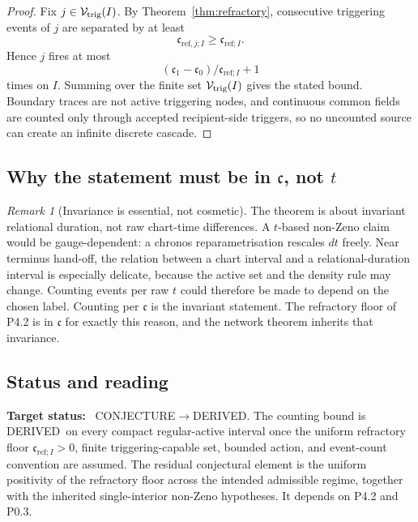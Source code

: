 \documentclass[11pt,a4paper]{article}
\newcommand{\stDerived}{\textcolor{cDer}{\textsf{\small DERIVED}}}
\newcommand{\stConj}{\textcolor{cCon}{\textsf{\small CONJECTURE}}}
\theoremstyle{definition}
\theoremstyle{plain}
\theoremstyle{remark}
\newtheorem{remark}[definition]{Remark}
\begin{document}
\begin{proof}
Fix \(j\in\mathcal V_{\rm trig}(I)\). By
Theorem~\ref{thm:refractory}, consecutive triggering events of \(j\) are separated
by at least
\[
\mathfrak c_{\mathrm{ref},j;I}\ge\mathfrak c_{\mathrm{ref};I}.
\]
Hence \(j\) fires at most
\[
(\mathfrak c_1-\mathfrak c_0)/\mathfrak c_{\mathrm{ref};I}+1
\]
times on \(I\). Summing over the finite set
\(\mathcal V_{\rm trig}(I)\) gives the stated bound. Boundary traces are not active
triggering nodes, and continuous common fields are counted only through accepted
recipient-side triggers, so no uncounted source can create an infinite discrete
cascade. \qedhere
\end{proof}

\subsection{Why the statement must be in \texorpdfstring{\(\mathfrak c\)}{c}, not \texorpdfstring{\(t\)}{t}}

\begin{remark}[Invariance is essential, not cosmetic]\label{rem:invariance}
The theorem is about invariant relational duration, not raw chart-time
differences. A \(t\)-based non-Zeno claim would be gauge-dependent: a chronos
reparametrisation rescales \(dt\) freely. Near terminus hand-off, the relation
between a chart interval and a relational-duration interval is especially delicate,
because the active set and the density rule may change. Counting events per raw
\(t\) could therefore be made to depend on the chosen label. Counting per
\(\mathfrak c\) is the invariant statement. The refractory floor of P4.2 is in
\(\mathfrak c\) for exactly this reason, and the network theorem inherits that
invariance.
\end{remark}

\subsection{Status and reading}

\textbf{Target status:}~
\stConj\(\to\)\stDerived. The counting bound is \stDerived\ on every compact
regular-active interval once the uniform refractory floor
\(\mathfrak c_{\mathrm{ref};I}>0\), finite triggering-capable set, bounded action,
and event-count convention are assumed. The residual conjectural element is the
uniform positivity of the refractory floor across the intended admissible regime,
together with the inherited single-interior non-Zeno hypotheses. It depends on
P4.2 and P0.3.
\end{document}
